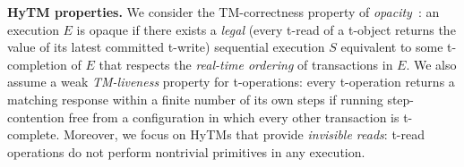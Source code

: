 %
\vspace{1mm}\noindent\textbf{HyTM properties.}
We consider the TM-correctness property of \emph{opacity}~\cite{tm-book}: an execution
$E$ is opaque if there exists a \emph{legal} (every t-read of a t-object returns the value of its latest committed t-write) sequential execution $S$ equivalent to some t-completion of $E$
that respects the \emph{real-time ordering} of transactions in $E$.
We also assume a weak \emph{TM-liveness} property for t-operations: every t-operation returns a matching
response within a finite number of its own steps if running step-contention free from a configuration in which every other transaction is t-complete.
Moreover, we focus on HyTMs that provide \emph{invisible reads}: t-read operations do not perform
nontrivial primitives in any execution.
%
%
% 	 
%
